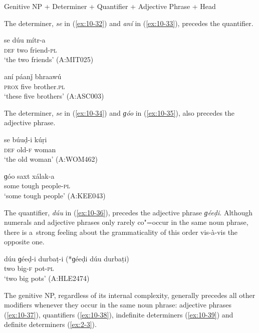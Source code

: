 Genitive NP + Determiner + Quantifier + Adjective Phrase + Head


The determiner, \textit{se} in (\ref{ex:10-32}) and \textit{aní} in (\ref{ex:10-33}), precedes the quantifier.

\begin{exe}
\ex
\label{ex:10-32}
\gll se dúu mítr-a \\
\textsc{def} two friend-\textsc{pl} \\
\glt `the two friends' (A:MIT025)

\ex
\label{ex:10-33}
\gll aní páanǰ bhraawú \\
\textsc{prox} five brother.\textsc{pl}  \\
\glt `these five brothers' (A:ASC003)
\end{exe}

The determiner, \textit{se} in (\ref{ex:10-34}) and \textit{ɡóo} in (\ref{ex:10-35}), also precedes the adjective phrase.

\begin{exe}
\ex
\label{ex:10-34}
\gll se búuḍ-i kúṛi \\
\textsc{def} old-\textsc{f} woman \\
\glt `the old woman' (A:WOM462)

\ex
\label{ex:10-35}
\gll ɡóo saxt xálak-a \\
some tough people-\textsc{pl}  \\
\glt `some tough people' (A:KEE043)
\end{exe}


The quantifier, \textit{dúu} in (\ref{ex:10-36}), precedes the adjective phrase \textit{ɡéeḍi}. Although numerals and adjective phrases only rarely co"=occur in the same noun phrase, there is a~strong feeling about the grammaticality of this order vis-à-vis the opposite one.

\begin{exe}
\ex
\label{ex:10-36}
\gll dúu ɡéeḍ-i durbaṭ-i (*ɡéeḍi dúu durbaṭi) \\
two big-\textsc{f} pot-\textsc{pl} \\
\glt `two big pots' (A:HLE2474)
\end{exe}


The genitive NP, regardless of its internal complexity, generally precedes all other modifiers
whenever they occur in the same noun phrase: adjective phrases (\ref{ex:10-37}), quantifiers
(\ref{ex:10-38}), indefinite determiners (\ref{ex:10-39}) and definite determiners
(\ref{ex:2-3}).

